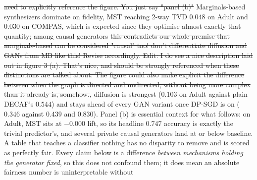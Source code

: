 \documentclass{article}
\begin{document}
\st{need to explicitly reference the figure. You just say "panel (b)"}
Marginals-based synthesizers dominate on fidelity, MST reaching
2-way TVD $0.048$ on Adult and $0.030$ on COMPAS, which is expected since they
optimise almost exactly that quantity; among causal generators \st{this contradicts our whole premise that marginals-based can be considered "causal" too! don't differentiate diffusion and GANs from MB like this! Revise accordingly. Edit: I do see a nice description laid out in figure 3 (a). That's nice, and should be strongly referenced when these distinctions are talked about. The figure could also make explicit the difference between when the graph is directed and undirected, without being more complex than it already is, somehow.}, diffusion is
strongest ($0.103$ on Adult against plain DECAF's $0.544$) and stays ahead of every
GAN variant once DP-SGD is on ($0.346$ against $0.439$ and $0.830$). Panel (b) is essential context for what follows: on Adult, MST sits at $-0.000$ lift, so its headline
$0.747$ accuracy is exactly the trivial predictor's, and several private causal
generators land at or below baseline. A table that teaches a classifier nothing
has no disparity to remove and is scored as perfectly fair. Every claim below is a
difference \emph{between mechanisms holding the generator fixed}, so this does not
confound them; it does mean an absolute fairness number is uninterpretable without
\end{document}
